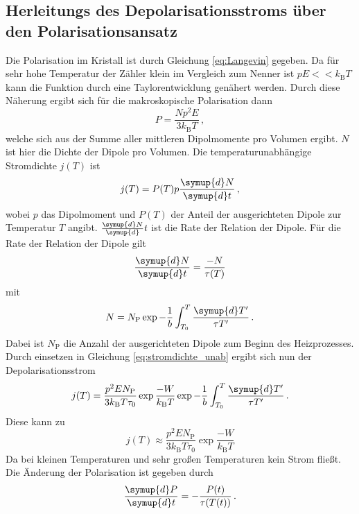 \subsection{Herleitungs des Depolarisationsstroms über den Polarisationsansatz}
\label{sec:polarisationsansatz}
Die Polarisation im Kristall ist durch Gleichung \eqref{eq:Langevin} gegeben.
Da für sehr hohe Temperatur der Zähler klein im Vergleich zum Nenner ist $pE << k_\text{B} T$ kann die Funktion durch eine Taylorentwicklung genähert werden.
Durch diese Näherung ergibt sich für die makroskopische Polarisation dann
\begin{equation}
    P = \frac{Np^2E}{3 k_\text{B}T} \, ,
    \label{eq:langevin2}
\end{equation}
welche sich aus der Summe aller mittleren Dipolmomente pro Volumen ergibt.
$N$ ist hier die Dichte der Dipole pro Volumen.
Die temperaturunabhängige Stromdichte $j(T)$ ist
\begin{equation}
    j(T) = P(T)p \frac{\symup{d}N}{\symup{d}t} \, ,
    \label{eq:stromdichte_unab}
\end{equation}
wobei $p$ das Dipolmoment und $P(T)$ der Anteil der ausgerichteten Dipole zur Temperatur $T$ angibt.
$\frac{\symup{d}N}{\symup{d}}t$ ist die Rate der Relation der Dipole.
Für die Rate der Relation der Dipole gilt
\begin{equation}
    \frac{\symup{d}N}{\symup{d}t} = \frac{-N}{\tau(T)}
\end{equation}
mit 
\begin{equation}
    N = N_\text{P} \exp{-\frac{1}{b} \int_{T_0}^{T} \frac{\symup{d}T'}{\tau{T'}}} \, .
\end{equation}
Dabei ist $N_\text{P}$ die Anzahl der ausgerichteten Dipole zum Beginn des Heizprozesses.
Durch einsetzen in Gleichung \eqref{eq:stromdichte_unab} ergibt sich nun der Depolarisationsstrom
\begin{equation}
    j(T) = \frac{p^2EN_\text{P}}{3 k_\text{B}T\tau_0} \exp{\frac{-W}{k_\text{B}T}} \exp{-\frac{1}{b} \int_{T_0}^{T} \frac{\symup{d}T'}{\tau{T'}}} \, .
\end{equation}
Diese kann zu 
\begin{equation}
    j(T) \approx  \frac{p^2EN_\text{P}}{3 k_\text{B}T\tau_0} \exp{\frac{-W}{k_\text{B}T}}
\end{equation}
Da bei kleinen Temperaturen und sehr großen Temperaturen kein Strom fließt.
Die Änderung der Polarisation ist gegeben durch
\begin{equation*}
    \frac{\symup{d}P}{\symup{d}t}=-\frac{P(t)}{\tau(T(t))} \, .
\end{equation*}
